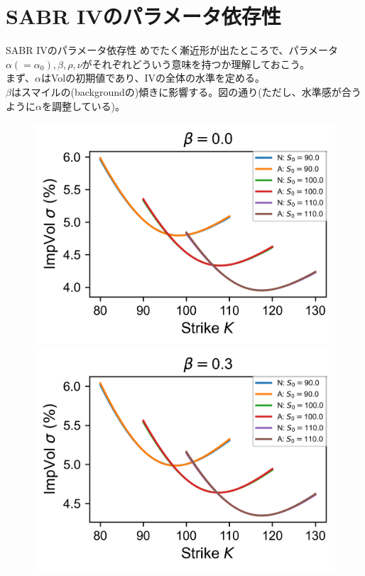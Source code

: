 \documentclass[dvipdfmx,9pt]{beamer}
\begin{document}
\section{SABR IVのパラメータ依存性}
\begin{frame}{SABR IVのパラメータ依存性}
  めでたく漸近形が出たところで、パラメータ$\alpha(=\alpha_{0}),\beta,\rho,\nu$がそれぞれどういう意味を持つか理解しておこう。\\
  まず、$\alpha$はVolの初期値であり、IVの全体の水準を定める。\\
  $\beta$はスマイルの(backgroundの)傾きに影響する。図の通り(ただし、水準感が合うように$\alpha$を調整している)。

  \begin{figure}
    \begin{minipage}[b]{0.48\linewidth}
      \raggedleft
      \includegraphics[width=0.7\linewidth]{image/beta/SABR_graph_0.0.png}
    \end{minipage}
    \hfill
    \begin{minipage}[b]{0.48\linewidth}
      \raggedright
      \includegraphics[width=0.7\linewidth]{image/beta/SABR_graph_0.3.png}
    \end{minipage}
  \end{figure}


\end{frame}
\end{document}

